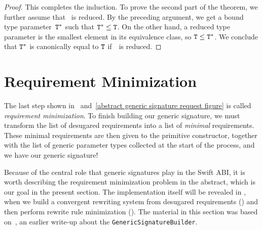 \documentclass[../generics]{subfiles}
\begin{document}
\begin{proof}
This completes the induction. To prove the second part of the theorem, we further assume that \tT\ is reduced. By the preceding argument, we get a bound type parameter~$\texttt{T}^*$ such that $\texttt{T}^*\le\texttt{T}$. On the other hand, a reduced type parameter is the smallest element in its equivalence class, so $\texttt{T}\le\texttt{T}^*$. We conclude that $\texttt{T}^*$ is canonically equal to $\texttt{T}$ if~\tT\ is reduced.
\end{proof}

\section{Requirement Minimization}\label{minimal requirements}

The last step shown in ~and~\ref{abstract generic signature request figure} is called \emph{requirement minimization}. To finish building our generic signature, we must transform the list of desugared requirements into a list of \emph{minimal} requirements. These minimal requirements are then given to the primitive constructor, together with the list of generic parameter types collected at the start of the process, and we have our generic signature!

Because of the central role that generic signatures play in the Swift ABI, it is worth describing the requirement minimization problem in the abstract, which is our goal in the present section. The implementation itself will be revealed in , when we build a convergent rewriting system from desugared requirements () and then perform rewrite rule minimization (). The material in this section was based on~\cite{gensig}, an earlier write-up about the \texttt{GenericSignatureBuilder}.
\end{document}
